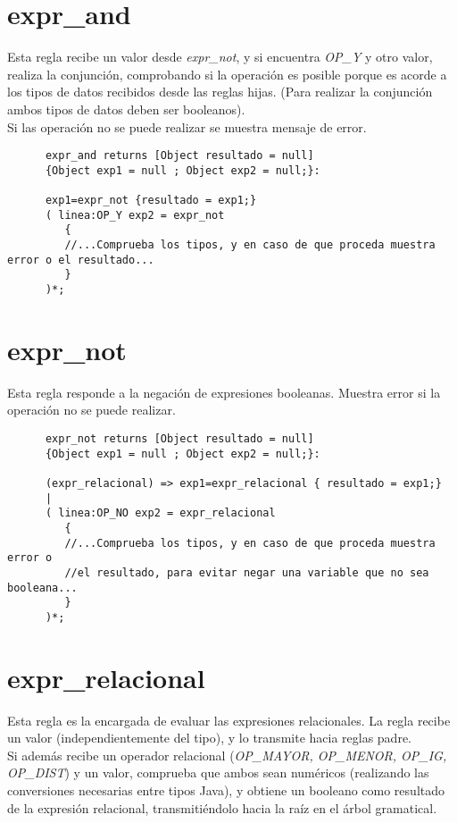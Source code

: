    \section{expr\_and}
   Esta regla recibe un valor desde \textit{expr\_not}, y si encuentra \textit{OP\_Y} y otro valor, realiza la conjunción, 
   comprobando si la operación es posible porque es acorde a los tipos de datos recibidos desde las reglas hijas. (Para 
   realizar la conjunción ambos tipos de datos deben ser booleanos).\\
  
   Si las operación no se puede realizar se muestra mensaje de error.
   \begin{lstlisting}
      expr_and returns [Object resultado = null]
      {Object exp1 = null ; Object exp2 = null;}: 

      exp1=expr_not {resultado = exp1;}
      ( linea:OP_Y exp2 = expr_not
         {
         //...Comprueba los tipos, y en caso de que proceda muestra error o el resultado...
         }
      )*;
   \end{lstlisting}

   \section{expr\_not}
   Esta regla responde a la negación de expresiones booleanas. Muestra error si la operación no se puede realizar.
   \begin{lstlisting}
      expr_not returns [Object resultado = null]
      {Object exp1 = null ; Object exp2 = null;}: 

      (expr_relacional) => exp1=expr_relacional { resultado = exp1;}
      |
      ( linea:OP_NO exp2 = expr_relacional
         {
         //...Comprueba los tipos, y en caso de que proceda muestra error o
         //el resultado, para evitar negar una variable que no sea booleana...
         }
      )*;
   \end{lstlisting}

   \section{expr\_relacional}
   Esta regla es la encargada de evaluar las expresiones relacionales. La regla recibe un valor (independientemente del
   tipo), y lo transmite hacia reglas padre.\\

   Si además recibe un operador relacional (\textit{OP\_MAYOR, OP\_MENOR, OP\_IG, OP\_DIST}) y un valor, comprueba que ambos 
   sean numéricos (realizando las conversiones necesarias entre tipos Java), y obtiene un booleano como resultado de la expresión 
   relacional, transmitiéndolo hacia la raíz en el árbol gramatical.\\

